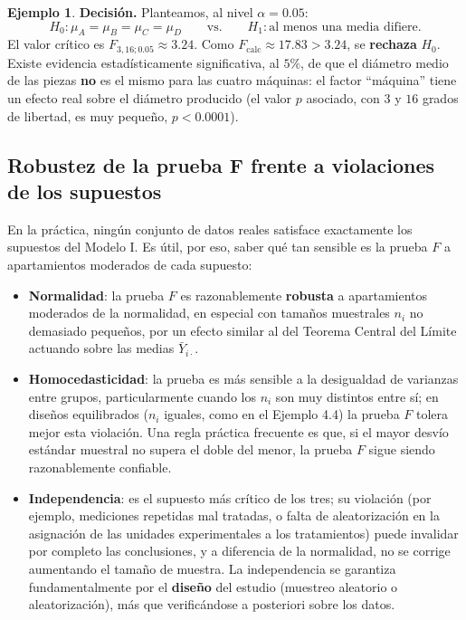 \documentclass[11pt,a4paper]{article}
\theoremstyle{plain}
\theoremstyle{definition}
\newtheorem{ejemplo}[teorema]{Ejemplo}
\theoremstyle{remark}
\begin{document}
\begin{ejemplo}
\medskip
\noindent\textbf{Decisión.} Planteamos, al nivel $\alpha=0.05$:
\[
H_0:\mu_A=\mu_B=\mu_C=\mu_D \qquad\text{vs.}\qquad H_1: \text{al menos una media difiere.}
\]
El valor crítico es $F_{3,16;0.05}\approx3.24$. Como $F_{\text{calc}}\approx17.83>3.24$, se \textbf{rechaza} $H_0$. Existe evidencia estadísticamente significativa, al $5\%$, de que el diámetro medio de las piezas \textbf{no} es el mismo para las cuatro máquinas: el factor ``máquina'' tiene un efecto real sobre el diámetro producido (el valor $p$ asociado, con $3$ y $16$ grados de libertad, es muy pequeño, $p<0.0001$).
\end{ejemplo}

\subsection{Robustez de la prueba F frente a violaciones de los supuestos}

En la práctica, ningún conjunto de datos reales satisface exactamente los supuestos del Modelo I. Es útil, por eso, saber qué tan sensible es la prueba $F$ a apartamientos moderados de cada supuesto:
\begin{itemize}
\item \textbf{Normalidad}: la prueba $F$ es razonablemente \textbf{robusta} a apartamientos moderados de la normalidad, en especial con tamaños muestrales $n_i$ no demasiado pequeños, por un efecto similar al del Teorema Central del Límite actuando sobre las medias $\bar Y_{i\cdot}$.
\item \textbf{Homocedasticidad}: la prueba es más sensible a la desigualdad de varianzas entre grupos, particularmente cuando los $n_i$ son muy distintos entre sí; en diseños equilibrados ($n_i$ iguales, como en el Ejemplo 4.4) la prueba $F$ tolera mejor esta violación. Una regla práctica frecuente es que, si el mayor desvío estándar muestral no supera el doble del menor, la prueba $F$ sigue siendo razonablemente confiable.
\item \textbf{Independencia}: es el supuesto más crítico de los tres; su violación (por ejemplo, mediciones repetidas mal tratadas, o falta de aleatorización en la asignación de las unidades experimentales a los tratamientos) puede invalidar por completo las conclusiones, y a diferencia de la normalidad, no se corrige aumentando el tamaño de muestra. La independencia se garantiza fundamentalmente por el \textbf{diseño} del estudio (muestreo aleatorio o aleatorización), más que verificándose a posteriori sobre los datos.
\end{itemize}
\end{document}
